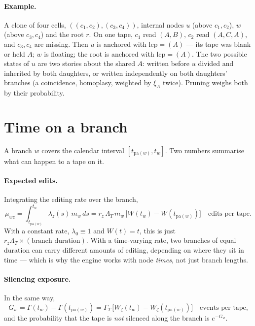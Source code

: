 \documentclass[11pt]{article}
\newcommand{\LamT}{\Lambda_T}
\newcommand{\lcp}{\mathrm{lcp}}
\newcommand{\pa}{\mathrm{pa}}
\newcommand{\GamT}{\Gamma_T}
\begin{document}
\paragraph{Example.} A clone of four cells, $((c_1,c_2),(c_3,c_4))$, internal nodes $u$ (above
$c_1,c_2$), $w$ (above $c_3,c_4$) and the root $r$. On one tape, $c_1$ read $(A,B)$, $c_2$ read
$(A,C,A)$, and $c_3,c_4$ are missing. Then $u$ is anchored with $\lcp=(A)$ --- its tape was blank or
held $A$; $w$ is floating; the root is anchored with $\lcp=(A)$. The two possible states of $u$ are
two stories about the shared $A$: written before $u$ divided and inherited by both daughters, or
written independently on both daughters' branches (a coincidence, homoplasy, weighted by
$\xi_A$ twice). Pruning weighs both by their probability.

\section{Time on a branch}\label{sec:time}

A branch $w$ covers the calendar interval $[t_{\pa(w)},t_w]$. Two numbers summarise what can happen
to a tape on it.

\paragraph{Expected edits.} Integrating the editing rate over the branch,
\begin{equation}
\mu_{wz}=\int_{t_{\pa(w)}}^{t_w}\lambda_z(s)\,m_w\,ds=r_z\,\LamT\,m_w\,\big[W(t_w)-W(t_{\pa(w)})\big]
\quad\text{edits per tape.}
\label{eq:mu}
\end{equation}
With a constant rate, $\lambda_0\equiv1$ and $W(t)=t$, this is just
$r_z\LamT\times(\text{branch duration})$. With a time-varying rate, two branches of equal duration can
carry different amounts of editing, depending on where they sit in time --- which is why the engine
works with node \emph{times}, not just branch lengths.

\paragraph{Silencing exposure.} In the same way,
\begin{equation}
G_w=\Gamma(t_w)-\Gamma(t_{\pa(w)})=\GamT\,\big[W_\zeta(t_w)-W_\zeta(t_{\pa(w)})\big]
\quad\text{events per tape,}
\label{eq:G}
\end{equation}
and the probability that the tape is \emph{not} silenced along the branch is $e^{-G_w}$.
\end{document}
